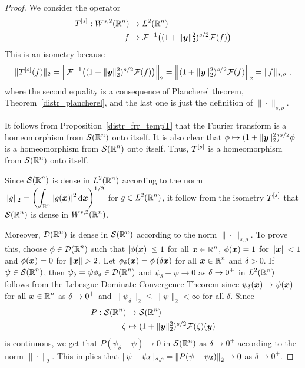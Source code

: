 \begin{proof}
We consider the operator
\begin{align*}
T^{[s]} : W^{s,2}(\mathbb{R}^n) & \to L^2(\mathbb{R}^n) \\
f &\mapsto \mathcal{F}^{-1}\big((1+\|{\bm{y}}\|_2^2)^{s/2} \mathcal{F}(f) \big)  
\end{align*}
This is an isometry because
\[
\|T^{[s]}(f)\|_2 = \left\| \mathcal{F}^{-1}\big((1+\|{\bm{y}}\|_2^2)^{s/2}
\mathcal{F}(f) \big) \right\|_2
= \left\| (1+\|{\bm{y}}\|_2^2)^{s/2} \mathcal{F}(f) \right\|_2
= \| f \|_{s,\rho} \ ,
\]
where the second equality is a consequence of Plancherel theorem,
Theorem~\ref{distr_plancherel}, and the last one is just the
definition of $\|\cdot\|_{s,\rho}$.

It follows from Proposition~\ref{distr_frr_tempT} that the Fourier
transform is a homeomorphism from $\displaystyle \mathcal{S}(\mathbb{R}^n)$ onto
itself.  It is also clear that
$\displaystyle \phi \mapsto (1+\|{\bm{y}}\|_2^2)^{s/2} \phi$ is a
homeomorphism from $\displaystyle \mathcal{S}(\mathbb{R}^n)$ onto itself.  Thus,
$\displaystyle T^{[s]}$ is a homeomorphism from $\displaystyle \mathcal{S}(\mathbb{R}^n)$
onto itself.

Since $\displaystyle \mathcal{S}(\mathbb{R}^n)$ is dense in $\displaystyle L^2(\mathbb{R}^n)$
according to the norm
$\displaystyle \|g\|_2 = \left(\int_{\mathbb{R}^n} |g({\bm{x}})|^2 \,\mathrm{d}{{\bm{x}}}
\right)^{1/2}$
for $\displaystyle g \in L^2(\mathbb{R}^n)$, it
follow from the isometry $\displaystyle T^{[s]}$ that
$\displaystyle \mathcal{S}(\mathbb{R}^n)$ is dense in $\displaystyle W^{s,2}(\mathbb{R}^n)$.

Moreover, $\displaystyle \mathcal{D}(\mathbb{R}^n)$ is dense in
$\displaystyle \mathcal{S}(\mathbb{R}^n)$ according to the norm
$\|\cdot\|_{s,\rho}$.  To prove this, choose $\displaystyle \phi \in \mathcal{D}(\mathbb{R}^n)$
such that $|\phi({\bm{x}})| \leq 1$ for all $\displaystyle {\bm{x}} \in \mathbb{R}^n$,
$\phi({\bm{x}}) = 1$ for $\|{\bm{x}}\|<1$ and
$\phi({\bm{x}}) = 0$ for $\|\VEC{x}\|>2$.  Let
$\displaystyle \phi_\delta({\bm{x}}) = \phi\left(\delta {\bm{x}}\right)$
for all $\displaystyle {\bm{x}} \in \mathbb{R}^n$ and $\delta >0$.  If
$\displaystyle \psi \in \mathcal{S}(\mathbb{R}^n)$, then
$\displaystyle \psi_\delta = \psi \phi_\delta \in \mathcal{D}(\mathbb{R}^n)$ and
$\psi_\delta - \psi \to 0$ as $\displaystyle \delta \to 0^+$ in
$\displaystyle L^2(\mathbb{R}^n)$
follows from the Lebesgue Dominate Convergence Theorem
since $\psi_{\delta}({\bm{x}}) \to \psi({\bm{x}})$ for all
$\displaystyle {\bm{x}} \in \mathbb{R}^n$ as $\displaystyle \delta \to 0^+$ and
$\|\psi_{\delta}\|_2 \leq \|\psi\|_2 < \infty$ for all $\delta$.
Since
\begin{align*}
  P: \mathcal{S}(\mathbb{R}^n) & \to \mathcal{S}(\mathbb{R}^n) \\
  \zeta &\mapsto (1+\|{\bm{y}}\|_2^2)^{s/2} \mathcal{F}(\zeta) ({\bm{y}})
\end{align*}
is continuous, we get that
$P(\psi_\delta - \psi) \to 0$ in $\displaystyle \mathcal{S}(\mathbb{R}^n)$ as $\delta \to 0^+$
according to the norm $\|\cdot\|_2$.
This implies that
$\displaystyle \| \psi - \psi_\delta \|_{s,\rho}
= \left\| P(\psi - \psi_\delta) \right\|_2 \to 0$ as $\delta \to 0^+$.
\end{proof}

